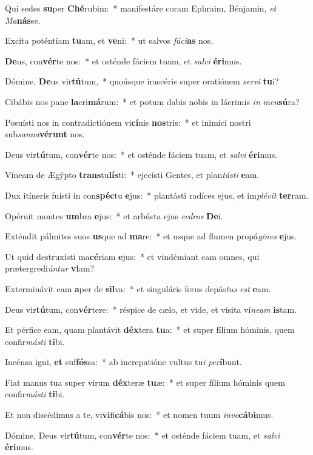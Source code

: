 \item Qui sedes \textbf{su}per \textbf{Ché}rubim:~* manifestáre coram Ephraim, Bénjamin, \textit{et} \textit{Ma}\textbf{nás}se.
\item Excita poténtiam \textbf{tu}am, et \textbf{ve}ni:~* ut salvos \textit{fá}\textit{ci}\textbf{as} nos.
\item \textbf{De}us, con\textbf{vér}te nos:~* et osténde fáciem tuam, et \textit{sal}\textit{vi} \textbf{é}\textbf{ri}mus.
\item Dómine, \textbf{De}us vir\textbf{tú}tum,~* quoúsque irascéris super oratiónem \textit{ser}\textit{vi} \textbf{tu}i?
\item Cibábis nos pane \textbf{la}cri\textbf{má}rum:~* et potum dabis nobis in lácrimis \textit{in} \textit{men}\textbf{sú}ra?
\item Posuísti nos in contradictiónem vi\textbf{cí}nis \textbf{nos}tris:~* et inimíci nostri sub\textit{san}\textit{na}\textbf{vé}\textbf{runt} nos.
\item Deus vir\textbf{tú}tum, con\textbf{vér}te nos:~* et osténde fáciem tuam, et \textit{sal}\textit{vi} \textbf{é}\textbf{ri}mus.
\item Víneam de Ægýpto \textbf{trans}tu\textbf{lís}ti:~* ejecísti Gentes, et plan\textit{tás}\textit{ti} \textbf{e}am.
\item Dux itíneris fuísti in con\textbf{spéc}tu \textbf{e}jus:~* plantásti radíces ejus, et im\textit{plé}\textit{vit} \textbf{ter}ram.
\item Opéruit montes \textbf{um}bra \textbf{e}jus:~* et arbústa ejus \textit{ce}\textit{dros} \textbf{De}i.
\item Exténdit pálmites suos \textbf{us}que ad \textbf{ma}re:~* et usque ad flumen propá\textit{gi}\textit{nes} \textbf{e}jus.
\item Ut quid destruxísti ma\textbf{cé}riam \textbf{e}jus:~* et vindémiant eam omnes, qui prætergredi\textit{ún}\textit{tur} \textbf{vi}am?
\item Exterminávit eam \textbf{a}per de \textbf{sil}va:~* et singuláris ferus depás\textit{tus} \textit{est} \textbf{e}am.
\item Deus vir\textbf{tú}tum, con\textbf{vér}tere:~* réspice de cælo, et vide, et vísita ví\textit{ne}\textit{am} \textbf{is}tam.
\item Et pérfice eam, quam plantávit \textbf{déx}tera \textbf{tu}a:~* et super fílium hóminis, quem confir\textit{más}\textit{ti} \textbf{ti}bi.
\item Incénsa igni, \textbf{et} suf\textbf{fós}sa:~* ab increpatióne vultus tu\textit{i} \textit{per}\textbf{í}bunt.
\item Fiat manus tua super virum \textbf{déx}teræ \textbf{tu}æ:~* et super fílium hóminis quem confir\textit{más}\textit{ti} \textbf{ti}bi.
\item Et non discédimus a te, vi\textbf{vi}fi\textbf{cá}bis nos:~* et nomen tuum \textit{in}\textit{vo}\textbf{cá}\textbf{bi}mus.
\item Dómine, Deus vir\textbf{tú}tum, con\textbf{vér}te nos:~* et osténde fáciem tuam, et \textit{sal}\textit{vi} \textbf{é}\textbf{ri}mus.
